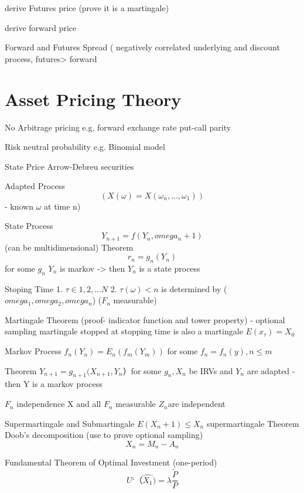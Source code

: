 \documentclass[11pt, openany]{book}              %
\begin{document}
derive Futures price (prove it is a martingale)

derive forward price

Forward and Futures Spread ( negatively correlated underlying and discount process, futures> forward

\chapter{Asset Pricing Theory}

No Arbitrage pricing 
	e.g. forward exchange rate 
	put-call parity 

Risk neutral probability 
	e.g. Binomial model

State Price
	Arrow-Debreu securities


Adapted Process 
	$$( X(\omega) = X(\omega_n, …,\omega_1) )$$ - known $\omega$ at time n)

State Process
    $$Y_{n+1}= f(Y_n, omega_n+1)$$ (can be multidimensional)
   Theorem
      $$r_n = g_n(Y_n)$$ for some $g_n$ 
      $Y_n$ is markov -> 
		then $Y_n$ is a state process

Stoping Time
    1. $\tau \in {1,2,…N}$
    2. $\tau(\omega)< n$ is determined by ($omega_1, omega_2, omega_n$)  ($F_n$ measurable) 


Martingale
   Theorem (proof- indicator function and tower property) - optional sampling 
        martingale stopped at stopping time is also a martingale $E(x_\tau) = X_0 $

Markov Process
   $f_n(Y_n) = E_n(f_m(Y_m))$
    for some $f_n = f_n(y), n \leq m$

  Theorem $Y_{n+1} = g_{n+1} (X_{n+1}, Y_n）$for some $g_n, X_n$ be IRVs and $Y_n$ are adapted - then Y is a markov process

$F_n$ independence
	X and all $F_n$ measurable $Z_n $are independent

Supermartingale and Submartingale
      $E(X_n+1) \leq X_n$ supermartingale
      Theorem Doob’s decomposition (use to prove optional sampling)
         $$X_n = M_n - A_n$$

Fundamental Theorem of Optimal Investment (one-period)
   $$U‘（\hat{X_1}) = \lambda \frac{\widetilde{P}}{P}$$
\end{document}
